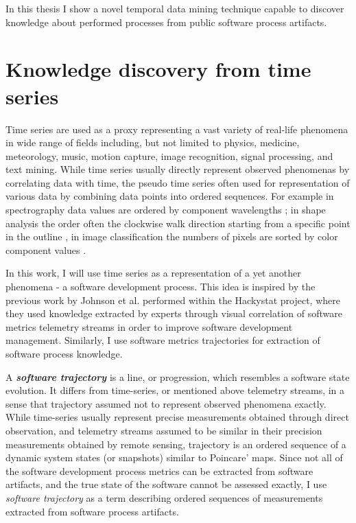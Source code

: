 In this thesis I show a novel temporal data mining technique capable to discover knowledge about performed processes
from public software process artifacts.

\section{Knowledge discovery from time series}\label{knowledge_discovery}
Time series are used as a proxy representing a vast variety of real-life phenomena 
in wide range of fields including, but not limited to physics, medicine, meteorology, 
music, motion capture, image recognition, signal processing, and text mining. 
While time series usually directly represent observed phenomenas by correlating data with time, the pseudo 
time series often used for representation of various data by combining data points into ordered sequences. 
For example in spectrography data values are ordered by component wavelengths \cite{citeulike:12550833};
in shape analysis the order often the clockwise walk direction starting from a
specific point in the outline \cite{citeulike:12550835}, in image classification the numbers of pixels
are sorted by color component values \cite{citeulike:2900542}.

In this work, I will use time series as a representation of a yet another phenomena - a software development 
process. This idea is inspired by the previous work by Johnson et al. \cite{citeulike:12550871} performed 
within the Hackystat project, where they used knowledge extracted by experts through visual correlation of
software metrics telemetry streams in order to improve software development management. Similarly, I use 
software metrics trajectories for extraction of software process knowledge. 

A \textit{\textbf{software trajectory}} is a line, or progression, which resembles a software state evolution.
It differs from time-series, or mentioned above telemetry streams, in a sense that trajectory assumed not to 
represent observed phenomena exactly. While time-series usually represent precise measurements obtained 
through direct observation, and telemetry streams assumed to be similar in their precision measurements 
obtained by remote sensing, trajectory is an ordered sequence of a dynamic system states (or snapshots)
similar to Poincare' maps. 
Since not all of the software development process metrics can be extracted from software artifacts, and the 
true state of the software cannot be assessed exactly, I use \textit{software trajectory} as a term describing 
ordered sequences of measurements extracted from software process artifacts.



